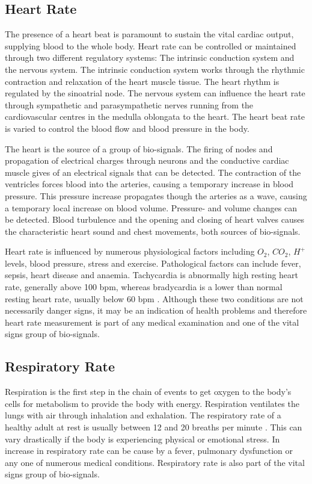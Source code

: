 \subsection{Heart Rate}
The presence of a heart beat is paramount to sustain the vital cardiac output, supplying blood to the whole body. Heart rate can be controlled or maintained through two different regulatory systems: The intrinsic conduction system and the nervous system. The intrinsic conduction system works through the rhythmic contraction and relaxation of the heart muscle tissue. The heart rhythm is regulated by the sinoatrial node. The nervous system can influence the heart rate through sympathetic and parasympathetic nerves running from the cardiovascular centres in the medulla oblongata to the heart. The heart beat rate is varied to control the blood flow and blood pressure in the body.

\medskip

The heart is the source of a group of bio-signals. The firing of nodes and propagation of electrical charges through neurons and the conductive cardiac muscle gives of an electrical signals that can be detected. The contraction of the  ventricles forces blood into the arteries, causing a temporary increase in blood pressure. This pressure increase propagates though the arteries as a wave, causing a temporary local increase on blood volume. Pressure- and volume changes can be detected. Blood turbulence and the opening and closing of heart valves causes the characteristic heart sound and chest movements, both sources of bio-signals.

\medskip

Heart rate is influenced by numerous physiological factors including $O_2$, $CO_2$, $H^+$ levels, blood pressure, stress and exercise. Pathological factors can include fever, sepsis, heart disease and anaemia. Tachycardia is abnormally high resting heart rate, generally above 100 bpm, whereas bradycardia is a lower than normal resting heart rate, usually below 60 bpm \citep{normalRestingHR}. Although these two conditions are not necessarily danger signs, it may be an indication of health problems and therefore heart rate measurement is part of any medical examination and one of the vital signs group of bio-signals.

\subsection{Respiratory Rate}
Respiration is the first step in the chain of events to get oxygen to the body's cells for metabolism to provide the body with energy. Respiration ventilates the lungs with air through inhalation and exhalation. The respiratory rate of a healthy adult at rest is usually between 12 and 20 breaths per minute \citep{medscapeBreathingRate}. This can vary drastically if the body is experiencing physical or emotional stress. In increase in respiratory rate can be cause by a fever, pulmonary dysfunction or any one of numerous medical conditions. Respiratory rate is also part of the vital signs group of bio-signals.

